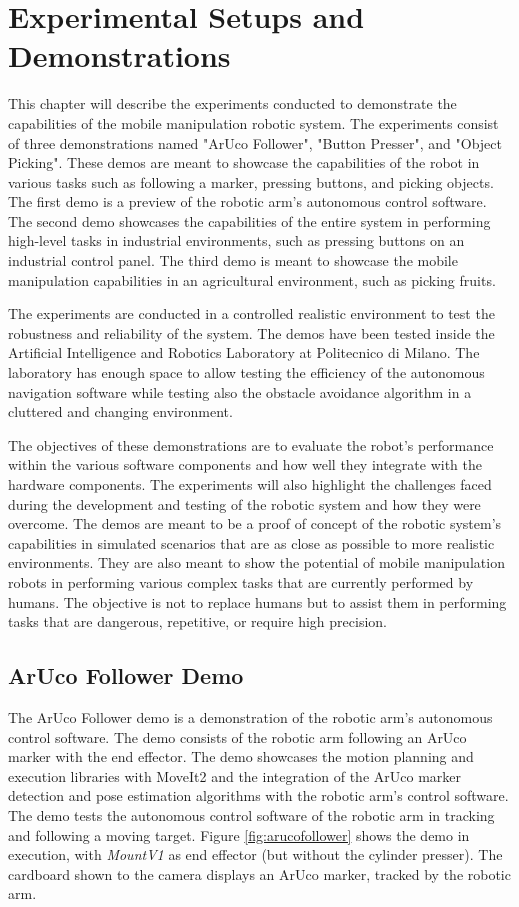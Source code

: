 \chapter{Experimental Setups and Demonstrations}

This chapter will describe the experiments conducted to demonstrate the capabilities of the mobile manipulation
robotic system. The experiments consist of three demonstrations named "ArUco Follower", "Button Presser", and "Object Picking".
These demos are meant to showcase the capabilities of the robot in various tasks such as following
a marker, pressing buttons, and picking objects. The first demo is a preview of the robotic arm's
autonomous control software. The second demo showcases the capabilities of the entire system in performing
high-level tasks in industrial environments, such as pressing buttons on an industrial control panel.
The third demo is meant to showcase the mobile manipulation capabilities in an agricultural environment, such as picking
fruits.

The experiments are conducted in a controlled realistic environment to test the robustness
and reliability of the system. The demos have been tested inside the Artificial Intelligence and Robotics Laboratory
at Politecnico di Milano. The laboratory has enough space to allow testing the efficiency of the autonomous 
navigation software while testing also the obstacle avoidance algorithm in a cluttered and changing environment.

The objectives of these demonstrations are to evaluate the robot's performance within the
various software components and how well they integrate with the hardware components. The experiments will also
highlight the challenges faced during the development and testing of the robotic system and how they were overcome.
The demos are meant to be a proof of concept of the robotic system's capabilities in simulated scenarios that are as close as
possible to more realistic environments. They are also meant to show the potential of mobile manipulation 
robots in performing various complex tasks that are currently performed by humans. The objective is not to
replace humans but to assist them in performing tasks that are dangerous, repetitive, or require high precision.

\section{ArUco Follower Demo}

The ArUco Follower demo is a demonstration of the robotic arm's autonomous control software. The demo
consists of the robotic arm following an ArUco marker with the end effector. The demo showcases the
motion planning and execution libraries with MoveIt2 and the integration of the ArUco marker detection 
and pose estimation algorithms with the robotic arm's control software.
The demo tests the autonomous control software of the robotic arm in tracking and following a moving target.
Figure \ref{fig:arucofollower} shows the demo in execution, with \textit{MountV1} as end effector (but without
the cylinder presser). The cardboard shown to the camera displays an ArUco marker, tracked by the robotic arm.

